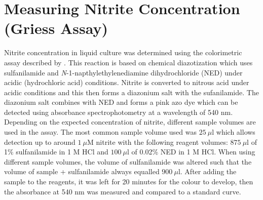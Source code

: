 \section{Measuring Nitrite Concentration (Griess Assay)}
Nitrite concentration in liquid culture was determined using the colorimetric assay described by \citet{DonaldNicholas1957}. This reaction is based on chemical diazotization which uses sulfanilamide and \textit{N}-1-napthylethylenediamine dihydrochloride (NED) under acidic (hydrochloric acid) conditions. Nitrite is converted to nitrous acid under acidic conditions and this then forms a diazonium salt with the sufanilamide. The diazonium salt combines with NED and forms a pink azo dye which can be detected using absorbance spectrophotometry at a wavelength of 540 nm. Depending on the expected concentration of nitrite, different sample volumes are used in the assay. The most common sample volume used was $25~\mu\textrm{l}$ which allows detection up to around $1~\mu\textrm{M}$ nitrite with the following reagent volumes: $875~\mu\textrm{l}$ of 1\% sulfanilamide in 1 M HCl and $100~\mu\textrm{l}$ of 0.02\% NED in 1 M HCl. When using different sample volumes, the volume of sulfanilamide was altered such that the volume of sample + sulfanilamide always equalled $900~\mu\textrm{l}$. After adding the sample to the reagents, it was left for 20 minutes for the colour to develop, then the absorbance at 540 nm was measured and compared to a standard curve.

